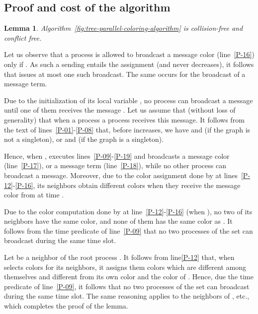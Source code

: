 \documentclass[11pt,english]{article}
\newtheorem{lemma}{Lemma}
\newcommand{\toto}{xxx}
\newenvironment{proofL}{\noindent{\bf
Proof }} {\hspace*{\fill}\par\vspace{3mm}}
\begin{document}
\subsection{Proof  and cost of the algorithm}

\begin{lemma}
\label{lemma:par-noCollision-noConflict}
Algorithm~{\em\ref{fig:tree-parallel-coloring-algorithm}}
is collision-free and conflict free. 
\end{lemma}

\begin{proofL}
Let us observe that a process  is allowed to broadcast a message 
{\sc color} (line~\ref{P-16}) only if 
. 
As such a sending entails the assignment 
 (and  never decreases), 
it follows that  issues at most one such broadcast.  
The same occurs for the broadcast of a message {\sc term}. 

Due to the initialization of its local variable , 
no process  can broadcast a message until one of them receives the message 
. Let  us assume that (without loss of generality) that 
 when a process a process  receives this message. 
It follows from the text of lines~\ref{P-01}-\ref{P-08} that, before
 increases, we have 
 and  (if the graph is not a singleton), or 
 and  (if the graph is a singleton).  

Hence, when ,   executes lines~\ref{P-09}-\ref{P-19}
and broadcasts a message {\sc color} (line~\ref{P-17}), or a message
{\sc term} (line~\ref{P-18}),
while no other process can broadcast a message. Moreover, 
due to the color assignment done by  at lines~\ref{P-12}-\ref{P-16}, 
its neighbors obtain different colors  
when they receive the message {\sc color} from  at time . 

Due to the color computation done by  at line~\ref{P-12}-\ref{P-16} 
(when  ), no two of its neighbors have the same color, and none
of them has the same color as . It follows from the time predicate 
of line~\ref{P-09} that no two processes of the set   
can broadcast during the same time slot. 

Let  be a neighbor of the root process . 
It follows from line\ref{P-12} that, when  selects colors for 
its neighbors, it assigns them colors which are different among themselves
and different from its own color and the color of . 
Hence, due the  time predicate of line~\ref{P-09}, it follows 
that no two processes  of the set  can broadcast 
during the same time slot.   
The same  reasoning applies to the neighbors of , etc., which completes 
the proof of the lemma. 
\renewcommand{\toto}{lemma:par-noCollision-noConflict}
\end{proofL}
\end{document}
